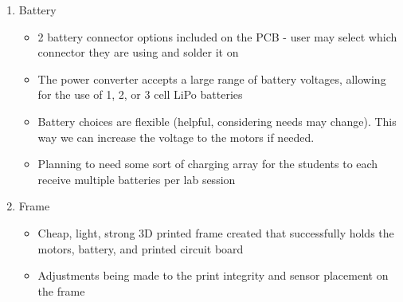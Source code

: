 \documentclass[12pt, titlepage]{article}
\begin{document}
\begin{enumerate}
\item Battery
\begin{itemize}
\item 2 battery connector options included on the PCB - user may select which connector they are using and solder it on
\item The power converter accepts a large range of battery voltages, allowing for the use of 1, 2, or 3 cell LiPo batteries
\item Battery choices are flexible (helpful, considering needs may change). This way we can increase the voltage to the motors if needed.
\item Planning to need some sort of charging array for the students to each receive multiple batteries per lab session
\end{itemize}

\item Frame
\begin{itemize}
\item Cheap, light, strong 3D printed frame created that successfully holds the motors, battery, and printed circuit board
\item Adjustments being made to the print integrity and sensor placement on the frame
\end{itemize}

\end{enumerate}
\end{document}
